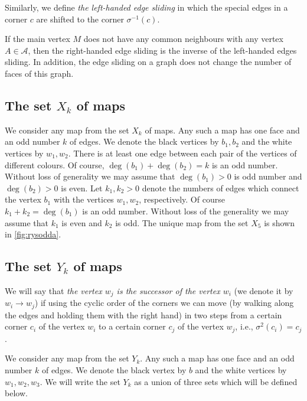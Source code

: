 \documentclass[submission]{FPSAC2021}
\DeclareMathOperator{\degg}{deg}
\newcommand{\nast}
{
	\sigma
}
\begin{document}
\medskip

Similarly, we define \emph{the left-handed edge sliding} 
in which the special edges in a corner $c$ are shifted to the corner $\nast^{-1}(c)$. 

If the main vertex $M$ does not have any common neighbours with any vertex $A\in\mathcal{A}$,
then the right-handed edge sliding is the inverse of the left-handed edges
sliding. 
In addition, the edge sliding on a graph does not change the
number of faces of this graph.  

\subsection{The set $X_k$ of maps} 

We consider any map from the set $X_k$ of maps. Any such a
map has one face and an odd number $k$ of edges. We denote the black
vertices by $b_1, b_2$ and the white vertices by $w_1, w_2$. There is
at least one edge between each pair of the vertices of different colours.
Of course, $\degg(b_1)+\degg(b_2)=k$ is an odd number. Without loss of generality 
we may assume that $\degg(b_1)>0$ is odd number and $\degg(b_2)>0$ is even.
Let $k_1, k_2 > 0$ denote the numbers of edges which connect
the vertex $b_1$ with the vertices $w_1, w_2$, respectively. 
Of course $k_1+k_2=\degg(b_1)$ is an odd number. Without loss of the generality 
we may assume that $k_1$ is
even and $k_2$ is odd. The unique map from the
set $X_5$ is shown in \cref{fig:rysodda}.

\subsection{The set $Y_k$ of maps}

We will say that \emph{the vertex $w_j$ is the successor of the vertex
$w_i$} (we denote it by $w_i \rightarrow w_j$) 
if using the cyclic order of the corners we
can move (by walking along the edges and holding them with the right hand)
in two steps from a certain corner $c_i$ of the vertex $w_i$ to a certain
corner $c_j$ of the vertex $w_j$, i.e., $\nast^2(c_i)=c_j$. 

We consider any map from the set $Y_k$. Any such a map has one
face and an odd number $k$ of edges. We denote the black vertex by $b$
and  the white vertices by $w_1, w_2, w_3$. We will write the set $Y_k$ as
a union of three sets which will be defined below.
\end{document}
